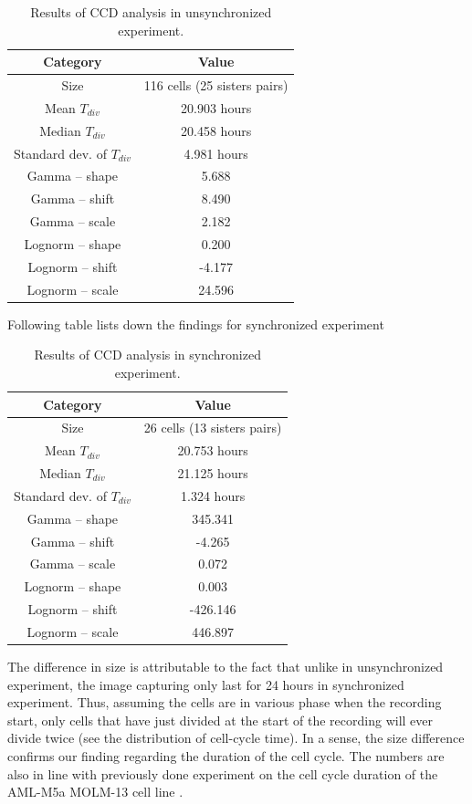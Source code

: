 \documentclass[pdftex,12pt,a4paper]{report}
\begin{document}
\begin{table}[H]
\centering
\begin{tabular}{ c | c }
Category & Value \\
\hline\hline
Size & 116 cells (25 sisters pairs) \\
Mean $T_{div}$ & 20.903 hours \\
Median $T_{div}$ & 20.458 hours \\
Standard dev. of $T_{div}$ & 4.981 hours \\
\hline
Gamma -- shape & 5.688 \\
Gamma -- shift & 8.490 \\
Gamma -- scale & 2.182 \\
\hline Lognorm -- shape & 0.200 \\
Lognorm --  shift & -4.177 \\
Lognorm --  scale & 24.596 \\
\end{tabular}
\caption[Results of CCD analysis in unsynchronized experiment]{Results of CCD analysis in unsynchronized experiment.}
\label{table:ccd_res_unsyn}
\end{table}

Following table lists down the findings for synchronized experiment

\begin{table}[H]
\centering
\begin{tabular}{ c | c }
Category & Value \\
\hline\hline
Size & 26 cells (13 sisters pairs) \\
Mean $T_{div}$ & 20.753 hours \\
Median $T_{div}$ & 21.125 hours \\
Standard dev. of $T_{div}$ & 1.324 hours \\
\hline
Gamma -- shape & 345.341 \\
Gamma -- shift & -4.265 \\
Gamma -- scale & 0.072 \\
\hline Lognorm -- shape & 0.003 \\
Lognorm --  shift & -426.146 \\
Lognorm --  scale & 446.897 \\
\end{tabular}
\caption[Results of CCD analysis in synchronized experiment]{Results of CCD analysis in synchronized experiment.}
\label{table:ccd_res_syn}
\end{table}

The difference in size is attributable to the fact that unlike in unsynchronized experiment, the image capturing only last for 24 hours in synchronized experiment. Thus, assuming the cells are in various phase when the recording start, only cells that have just divided at the start of the recording will ever divide twice (see the distribution of cell-cycle time). In a sense, the size difference confirms our finding regarding the duration of the cell cycle. The numbers are also in line with  previously done experiment on the cell cycle  duration of the AML-M5a MOLM-13 cell line \cite{sekhavati2015dynamic}.
\end{document}
